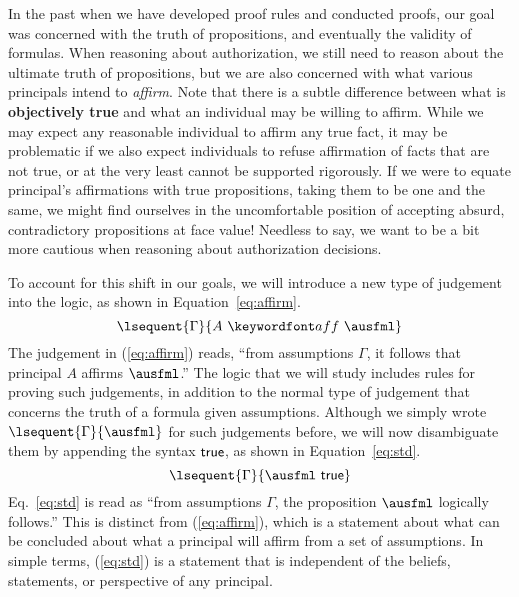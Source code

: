 \documentclass[11pt,twoside]{scrartcl}
\begin{document}
In the past when we have developed proof rules and conducted proofs, our goal was concerned with the truth of propositions, and eventually the validity of formulas. 
When reasoning about authorization, we still need to reason about the ultimate truth of propositions, but we are also concerned with what various principals intend to \emph{affirm}.
Note that there is a subtle difference between what is \textbf{objectively true} and what an individual may be willing to affirm.
While we may expect any reasonable individual to affirm any true fact, it may be problematic if we also expect individuals to refuse affirmation of facts that are not true, or at the very least cannot be supported rigorously.
If we were to equate principal's affirmations with true propositions, taking them to be one and the same, we might find ourselves in the uncomfortable position of accepting absurd, contradictory propositions at face value!
Needless to say, we want to be a bit more cautious when reasoning about authorization decisions.

To account for this shift in our goals, we will introduce a new type of judgement into the logic, as shown in Equation~\ref{eq:affirm}.
\begin{equation}
\label{eq:affirm}
\lsequent{\Gamma}{\aff{A}{\ausfml}}
\end{equation}
The judgement in (\ref{eq:affirm}) reads, ``from assumptions $\Gamma$, it follows that principal $A$ affirms $\ausfml$.'' The logic that we will study includes rules for proving such judgements, in addition to the normal type of judgement that concerns the truth of a formula given assumptions. 
Although we simply wrote $\lsequent{\Gamma}{\ausfml}$ for such judgements before, we will now disambiguate them by appending the syntax $\mathsf{true}$, as shown in Equation~\ref{eq:std}.
\begin{equation}
\label{eq:std}
\lsequent{\Gamma}{\ausfml~\strue}
\end{equation}
Eq.~\ref{eq:std} is read as ``from assumptions $\Gamma$, the proposition $\ausfml$ logically follows.'' This is distinct from (\ref{eq:affirm}), which is a statement about what can be concluded about what a principal will affirm from a set of assumptions. 
In simple terms, (\ref{eq:std}) is a statement that is independent of the beliefs, statements, or perspective of any principal.
\end{document}
